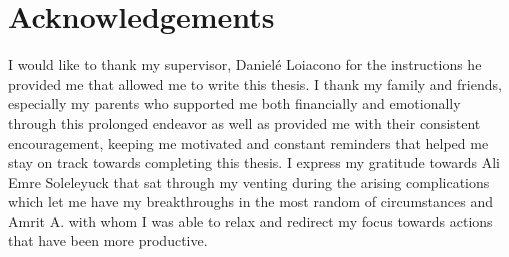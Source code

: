 \documentclass{Configuration_Files/PoliMi3i_thesis}
\begin{document}
\listoffigures

\listoftables


\chapter*{Acknowledgements}
I would like to thank my supervisor, Daniel\'e Loiacono for the instructions he provided me that allowed me to write this thesis.
I thank my family and friends, especially my parents who supported me both financially and emotionally through this prolonged endeavor as well as provided me with their consistent encouragement, keeping me motivated and constant reminders that helped me stay on track towards completing this thesis. I express my gratitude towards Ali Emre Soleleyuck that sat through my venting during the arising complications which let me have my breakthroughs in the most random of circumstances and Amrit A. with whom I was able to relax and redirect my focus towards actions that have been more productive.

\cleardoublepage
\end{document}
